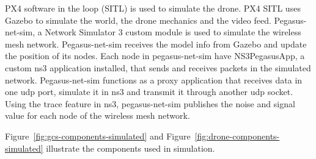 PX4 software in the loop (SITL) is used to simulate the drone. PX4 SITL uses Gazebo to simulate the world, the drone mechanics and the video feed. Pegasus-net-sim, a Network Simulator 3 custom module is used to simulate the wireless mesh network. Pegasus-net-sim receives the model info from Gazebo and update the position of its nodes. Each node in pegasus-net-sim have NS3PegasusApp, a custom ns3 application installed, that sends and receives packets in the simulated network. Pegasus-net-sim functions as a proxy application that receives data in one udp port, simulate it in ns3 and transmit it through another udp socket. Using the trace feature in ns3, pegasus-net-sim publishes the noise and signal value for each node of the wireless mesh network.

Figure~\ref{fig:gcs-components-simulated} and Figure~\ref{fig:drone-components-simulated} illustrate the components used in simulation. 

